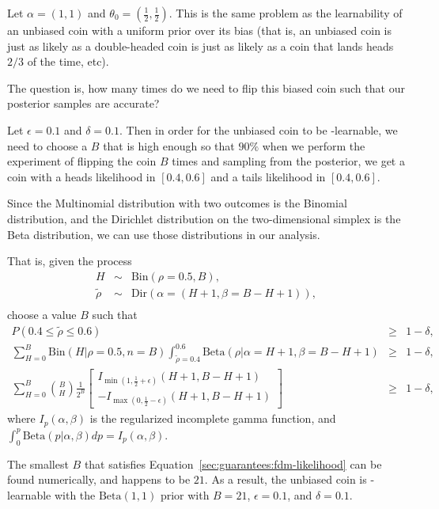 Let $\alpha=(1, 1)$ and $\theta_0=(\frac 1 2, \frac 1 2)$. This is the same problem as the learnability of an unbiased coin with a uniform prior over its bias (that is, an unbiased coin is just as likely as a double-headed coin is just as likely as a coin that lands heads $2/3$ of the time, etc).

The question is, how many times do we need to flip this biased coin such that our posterior samples are accurate?

Let $\epsilon = 0.1$ and $\delta = 0.1$. Then in order for the unbiased coin to be \bed-learnable, we need to choose a $B$ that is high enough so that $90\%$ when we perform the experiment of flipping the coin $B$ times and sampling from the posterior, we get a coin with a heads likelihood in $[0.4,0.6]$ and a tails likelihood in $[0.4,0.6]$.

Since the Multinomial distribution with two outcomes is the Binomial distribution, and the Dirichlet distribution on the two-dimensional simplex is the Beta distribution, we can use those distributions in our analysis.

That is, given the process
\begin{eqnarray}
H &\sim& \mbox{Bin}(\rho=0.5, B),\\
\tilde \rho &\sim& \mbox{Dir}(\alpha=(H+1, \beta=B-H+1)),\\
\end{eqnarray}
choose a value $B$ such that
\begin{eqnarray}
P(0.4\leq \tilde \rho\leq 0.6)&\geq& 1-\delta,\\
%
\sum_{H=0}^B \mbox{Bin}(H|\rho=0.5,n=B) \int_{\tilde \rho=0.4}^{0.6} \mbox{Beta}(\rho|\alpha=H+1,\beta=B-H+1)&\geq& 1-\delta,\\
%
\label{sec:guarantees:fdm-likelihood}
\sum_{H=0}^B {B \choose H} \frac 1 {2^B}
\left[
 \begin{array}{l}
  I_{\min({1,{\frac 1 2 + \epsilon}})}(H+1,B-H+1)\\
  -I_{\max({0,{\frac 1 2 - \epsilon}})}(H+1,B-H+1)
 \end{array}
\right]&\geq& 1-\delta,
\end{eqnarray}
where $I_p(\alpha,\beta)$ is the regularized incomplete gamma function, and $\int_0^p\mbox{Beta}(p|\alpha,\beta) dp = I_p(\alpha,\beta)$.

The smallest $B$ that satisfies Equation~\ref{sec:guarantees:fdm-likelihood} can be found numerically, and happens to be $21$. As a result, the unbiased coin is \bed-learnable with the $\mbox{Beta}(1,1)$ prior with $B=21$, $\epsilon=0.1$, and $\delta=0.1$.

